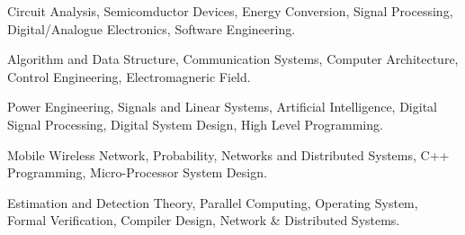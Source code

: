 
\begin{cventries}
\cventry
    {} %
    {} %
    {} %
    {} %
    {
      \begin{cvitems} %
         \item {Circuit Analysis, Semicomductor Devices, Energy Conversion, Signal Processing, Digital/Analogue Electronics, Software Engineering.}
         \item {Algorithm and Data Structure, Communication Systems, Computer Architecture, Control Engineering, Electromagneric Field.}
         \item {Power Engineering, Signals and Linear Systems, Artificial Intelligence, Digital Signal Processing, Digital System Design, High Level Programming.} 
         \item {Mobile Wireless Network, Probability, Networks and Distributed Systems, C++ Programming, Micro-Processor System Design.}
         \item {Estimation and Detection Theory, Parallel Computing, Operating System, Formal Verification, Compiler Design, Network \& Distributed Systems.}        
      \end{cvitems}
    }
  
\end{cventries}

